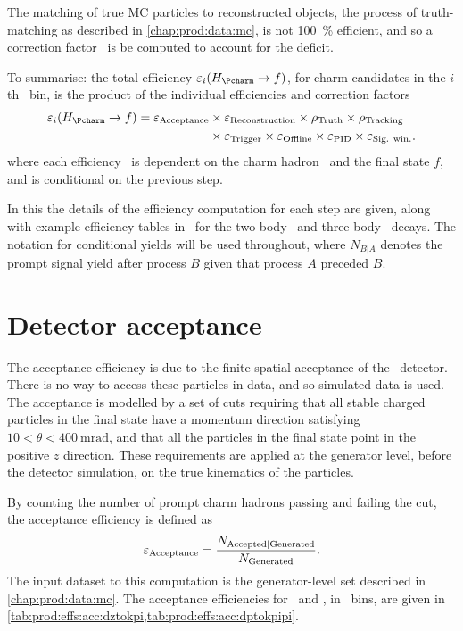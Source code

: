 The matching of true \ac{MC} particles to reconstructed objects, the process of 
truth-matching as described in \cref{chap:prod:data:mc}, is not \SI{100}{\%} 
efficient, and so a correction factor \efftruth\ is be computed to account for 
the deficit.

To summarise: the total efficiency $\eff_{i}(\decay{\PHc}{f})$, for charm 
candidates in the $i$th \pTy\ bin, is the product of the individual 
efficiencies and correction factors
\begin{align}
  \eff_{i}(\decay{\PHc}{f}) = \effacc &\times \effreco \times \efftruth \times \efftracking \nonumber\\
                                      &\times \efftrig \times \effoffline \times \effpid \times \effsigwin.
  \label{eqn:prod:effs:total_eff}
\end{align}
where each efficiency \eff\ is dependent on the charm hadron \PHc\ and the 
final state $f$, and is conditional on the previous step.

In this  the details of the efficiency computation for 
each step are given, along with example efficiency tables in \pTy\ for the 
two-body \DzToKpi\ and three-body \DpToKpipi\ decays.
The notation for conditional yields will be used throughout, where $N_{B|A}$ 
denotes the prompt signal yield after process $B$ given that process $A$ 
preceded $B$.

\section{Detector acceptance}
\label{chap:prod:effs:acc}

The acceptance efficiency is due to the finite spatial acceptance of the \lhcb\ 
detector.
There is no way to access these particles in data, and so simulated data is 
used.
The acceptance is modelled by a set of cuts requiring that all stable charged 
particles in the final state have a momentum direction satisfying $10 < \theta 
< \SI{400}{\milli\radian}$, and that all the particles in the final state point 
in the positive $z$ direction.
These requirements are applied at the generator level, before the detector 
simulation, on the true kinematics of the particles.

By counting the number of prompt charm hadrons passing and failing the cut, the 
acceptance efficiency is defined as
\begin{equation}
  \effacc = \frac{%
    N_{\text{Accepted}|\text{Generated}}
  }
  {%
    N_{\text{\text{Generated}}}
  }.
  \label{eqn:prod:effs:acc}
\end{equation}
The input dataset to this computation is the generator-level set described in 
\cref{chap:prod:data:mc}.
The acceptance efficiencies for \DzToKpi\ and \DpToKpipi, in \pTy\ bins, are 
given in \cref{tab:prod:effs:acc:dztokpi,tab:prod:effs:acc:dptokpipi}.

